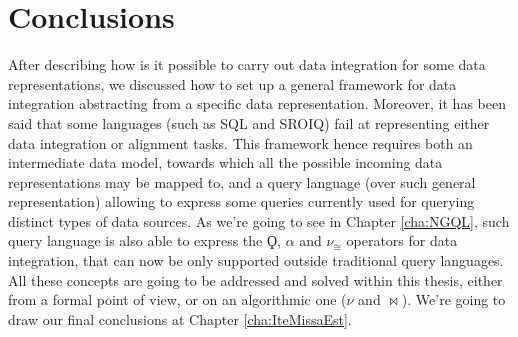 \section{Conclusions}

After describing how is it possible to carry out data integration for some data representations, we discussed how to set up
a general framework for data integration abstracting from a specific data representation. %
 Moreover, it has been said that some languages (such as SQL and SROIQ) fail at representing either data integration or alignment tasks. %
This framework hence requires both an intermediate data model, towards which all the possible incoming data representations may be mapped to, and a query language (over such general representation) allowing to express some  queries currently used for querying distinct types of data sources. As we're going to see in Chapter \ref{cha:NGQL}, such query language is also able to express the $\Qoppa$, $\alpha$ and $\nu_\cong$ operators for data integration, that can now be only supported outside traditional query languages. All these concepts are going to be addressed and solved within this thesis, either from a formal point of view, or on an algorithmic one ($\nu$ and $\bowtie$). We're going to draw our final conclusions at Chapter \ref{cha:IteMissaEst}. 